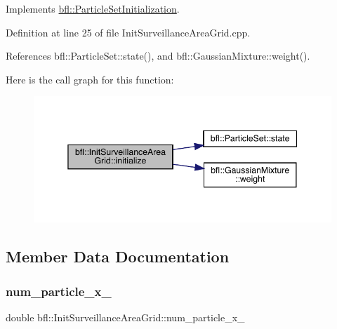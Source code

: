 Implements \mbox{\hyperlink{classbfl_1_1ParticleSetInitialization_a2e4a2a62f8bf9863a75cb83ad9e35f7d}{bfl\+::\+Particle\+Set\+Initialization}}.



Definition at line 25 of file Init\+Surveillance\+Area\+Grid.\+cpp.



References bfl\+::\+Particle\+Set\+::state(), and bfl\+::\+Gaussian\+Mixture\+::weight().

Here is the call graph for this function\+:
\nopagebreak
\begin{figure}[H]
\begin{center}
\leavevmode
\includegraphics[width=345pt]{classbfl_1_1InitSurveillanceAreaGrid_a77598c277d7a25b4ee31791cc71da7b7_cgraph}
\end{center}
\end{figure}


\subsection{Member Data Documentation}
\mbox{\label{classbfl_1_1InitSurveillanceAreaGrid_a9bba0cb16db162afd37d3c1c33ce3a5c}} 
\subsubsection{\texorpdfstring{num\+\_\+particle\+\_\+x\+\_\+}{num\_particle\_x\_}}
{\footnotesize\ttfamily double bfl\+::\+Init\+Surveillance\+Area\+Grid\+::num\+\_\+particle\+\_\+x\+\_\+\hspace{0.3cm}{\ttfamily [protected]}}



